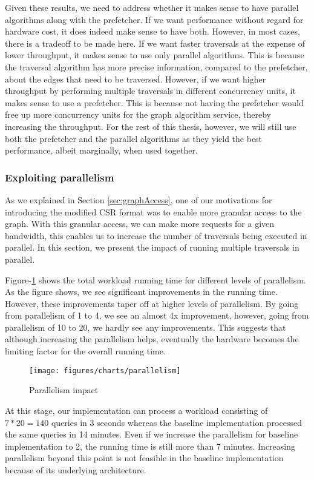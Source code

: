\medskip
Given these results, we need to address whether it makes sense to have parallel
algorithms along with the prefetcher. If we want performance without regard for
hardware cost, it does indeed make sense to have both. However, in most cases,
there is a tradeoff to be made here. If we want faster traversals at the expense
of lower throughput, it makes sense to use only parallel algorithms. This is
because the traversal algorithm has more precise information, compared to the 
prefetcher, about the edges that need to be traversed. However, if we want
higher throughput by performing multiple traversals in different
concurrency units, it makes sense to use a prefetcher. This is because not
having the prefetcher
would free up more concurrency units for the graph algorithm service, thereby
increasing the throughput. For the rest of this thesis, however, we will still
use both the prefetcher and the parallel algorithms as they yield the best
performance, albeit marginally, when used together.

\subsubsection{Exploiting parallelism}
As we explained in Section \ref{sec:graphAccess}, one of our motivations for
introducing the modified CSR format was to enable more granular access to the
graph. With this granular access, we can make more requests for a given
bandwidth, this enables us to increase the number of traversals being
executed in parallel. In this section, we present the impact of running multiple
traversals in parallel.

\medskip
Figure-\ref{fig:parallelismImpact} shows the total workload running time for
different levels of parallelism. As the figure shows, we see significant
improvements in the running time. However, these improvements taper off at
higher levels of parallelism. By going from parallelism of 1 to 4, we see an
almost 4x improvement, however, going from parallelism of 10 to 20, we hardly
see any improvements. This suggests that although increasing the parallelism
helps, eventually the hardware becomes the limiting factor for the overall
running time. 
\begin{figure}[ht]
    \centering
    \texttt{[image: figures/charts/parallelism]}
    \caption{Parallelism impact}
    \label{fig:parallelismImpact}
\end{figure}

\medskip
At this stage, our implementation can process a workload consisting of
$7*20 = 140$ queries in 3 seconds whereas the baseline implementation processed
the same queries in 14 minutes. Even if we increase the parallelism for baseline
implementation to 2, the running time is still more than 7 minutes. Increasing
parallelism beyond this point is not feasible in the baseline implementation
because of its underlying architecture.

